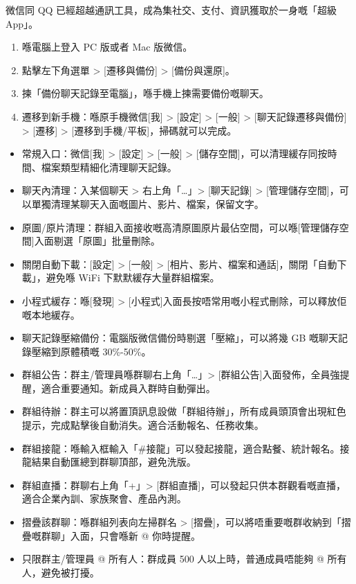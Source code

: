 
微信同 QQ 已經超越通訊工具，成為集社交、支付、資訊獲取於一身嘅「超級 App」。


\begin{enumerate}
  \item 喺電腦上登入 PC 版或者 Mac 版微信。
  \item 點擊左下角選單 > [遷移與備份] > [備份與還原]。
  \item 揀「備份聊天記錄至電腦」，喺手機上揀需要備份嘅聊天。
  \item 遷移到新手機：喺原手機微信[我] > [設定] > [一般] > [聊天記錄遷移與備份] > [遷移] > [遷移到手機/平板]，掃碼就可以完成。
\end{enumerate}


\begin{itemize}
  \item 常規入口：微信[我] > [設定] > [一般] > [儲存空間]，可以清理緩存同按時間、檔案類型精細化清理聊天記錄。
  \item 聊天內清理：入某個聊天 > 右上角「…」> [聊天記錄] > [管理儲存空間]，可以單獨清理某聊天入面嘅圖片、影片、檔案，保留文字。
  \item 原圖/原片清理：群組入面接收嘅高清原圖原片最佔空間，可以喺[管理儲存空間]入面剔選「原圖」批量刪除。
  \item 關閉自動下載：[設定] > [一般] > [相片、影片、檔案和通話]，關閉「自動下載」，避免喺 WiFi 下默默緩存大量群組檔案。
  \item 小程式緩存：喺[發現] > [小程式]入面長按唔常用嘅小程式刪除，可以釋放佢嘅本地緩存。
  \item 聊天記錄壓縮備份：電腦版微信備份時剔選「壓縮」，可以將幾 GB 嘅聊天記錄壓縮到原體積嘅 30\%-50\%。
\end{itemize}


\begin{itemize}
  \item 群組公告：群主/管理員喺群聊右上角「…」> [群組公告]入面發佈，全員強提醒，適合重要通知。新成員入群時自動彈出。
  \item 群組待辦：群主可以將置頂訊息設做「群組待辦」，所有成員頭頂會出現紅色提示，完成點擊後自動消失。適合活動報名、任務收集。
  \item 群組接龍：喺輸入框輸入「\#接龍」可以發起接龍，適合點餐、統計報名。接龍結果自動匯總到群聊頂部，避免洗版。
  \item 群組直播：群聊右上角「+」> [群組直播]，可以發起只供本群觀看嘅直播，適合企業內訓、家族聚會、產品內測。
  \item 摺疊該群聊：喺群組列表向左掃群名 > [摺疊]，可以將唔重要嘅群收納到「摺疊嘅群聊」入面，只會喺新 @ 你時提醒。
  \item 只限群主/管理員 @ 所有人：群成員 500 人以上時，普通成員唔能夠 @ 所有人，避免被打擾。
\end{itemize}

